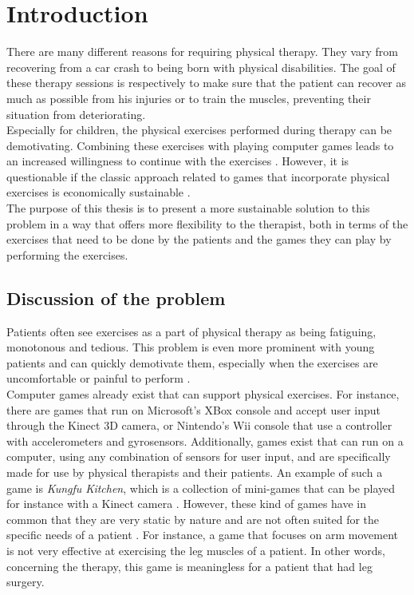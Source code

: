 \chapter{Introduction}

There are many different reasons for requiring physical therapy. They vary from recovering from a car crash to being born with physical disabilities. The goal of these therapy sessions is respectively to make sure that the patient can recover as much as possible from his injuries or to train the muscles, preventing their situation from deteriorating.\\

Especially for children, the physical exercises performed during therapy can be demotivating. Combining these exercises with playing computer games leads to an increased willingness to continue with the exercises \cite{Brauner2013}. However, it is questionable if the classic approach related to games that incorporate physical exercises is economically sustainable \cite{Nakevska2011}.\\

The purpose of this thesis is to present a more sustainable solution to this problem in a way that offers more flexibility to the therapist, both in terms of the exercises that need to be done by the patients and the games they can play by performing the exercises.


\section{Discussion of the problem}

Patients often see exercises as a part of physical therapy as being fatiguing, monotonous and tedious. This problem is even more prominent with young patients and can quickly demotivate them, especially when the exercises are uncomfortable or painful to perform \cite{Annema2013}.\\

Computer games already exist that can support physical exercises. For instance, there are games that run on Microsoft's XBox console and accept user input through the Kinect 3D camera, or Nintendo's Wii console that use a controller with accelerometers and gyrosensors. Additionally, games exist that can run on a computer, using any combination of sensors for user input, and are specifically made for use by physical therapists and their patients. An example of such a game is \emph{Kungfu Kitchen}, which is a collection of mini-games that can be played for instance with a Kinect camera \cite{KungFuKitchen}. However, these kind of games have in common that they are very static by nature and are not often suited for the specific needs of a patient \cite{Geurts2011}. For instance, a game that focuses on arm movement is not very effective at exercising the leg muscles of a patient. In other words, concerning the therapy, this game is meaningless for a patient that had leg surgery.\\

